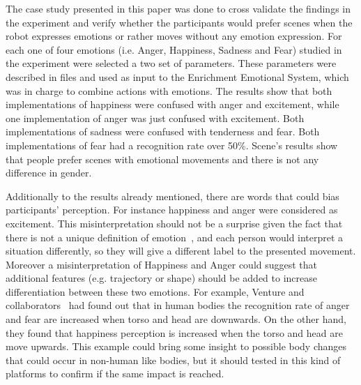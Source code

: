 The case study presented in this paper was done to cross validate the findings in the experiment and verify whether the participants would prefer scenes when the robot expresses emotions or rather moves without any emotion expression. For each one of four emotions (i.e. Anger, Happiness, Sadness and Fear) studied in the experiment were selected a two set of parameters. These parameters were described in files and used as input to the Enrichment Emotional System, which was in charge to combine actions with emotions. The results show that both implementations of happiness were confused with anger and excitement, while one implementation of anger was just confused with excitement. Both implementations of sadness were confused with tenderness and fear. Both implementations of fear had a recognition rate over 50\%. Scene's results show that people prefer scenes with emotional movements and there is not any difference in gender.

Additionally to the results already mentioned, there are words that could bias participants' perception. For instance happiness and anger were considered as excitement. This misinterpretation should not be a surprise given the fact that there is not a unique definition of emotion~\cite{Plutchik2001,cacioppo2000handbook}, and each person would interpret a situation differently, so they will give a different label to the presented movement. Moreover a misinterpretation of Happiness and Anger could suggest that additional features (e.g. trajectory or shape) should be added to increase differentiation between these two emotions. For example, Venture and collaborators~\cite{Venture2014} had found out that in human bodies the recognition rate of anger and fear are increased when torso and head are downwards. On the other hand, they found that happiness perception is increased when the torso and head are move upwards. This example could bring some insight to possible body changes that could occur in non-human like bodies, but it should tested in this kind of platforms to confirm if the same impact is reached.
 